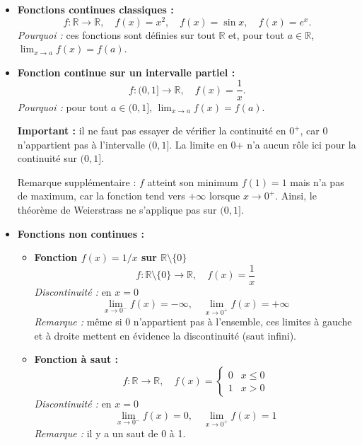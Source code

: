 \documentclass{report} %
\theoremstyle{definition}  %
\theoremstyle{plain} %
\theoremstyle{remark} %
\begin{document}
\begin{itemize}
    \item \textbf{Fonctions continues classiques :}  
    \[
    f : \mathbb{R} \to \mathbb{R}, \quad f(x) = x^2, \quad f(x) = \sin x, \quad f(x) = e^x.
    \]  
    \emph{Pourquoi :} ces fonctions sont définies sur tout \(\mathbb{R}\) et, pour tout
    \(a \in \mathbb{R}\), \(\lim_{x \to a} f(x) = f(a)\).

    \item \textbf{Fonction continue sur un intervalle partiel :}  
    \[
    f : (0,1] \to \mathbb{R}, \quad f(x) = \frac{1}{x}.
    \]  
    \emph{Pourquoi :} pour tout \(a \in (0,1]\), \(\lim_{x \to a} f(x) = f(a)\).  

    \medskip
    \noindent
    \textbf{Important :} il ne faut pas essayer de vérifier la continuité en \(0^+\),
    car 0 n’appartient pas à l’intervalle \((0,1]\). La limite en 0+ n’a
    aucun rôle ici pour la continuité sur \((0,1]\).  

    \medskip
    \noindent
    Remarque supplémentaire : \(f\) atteint son minimum \(f(1) = 1\) mais
    n’a pas de maximum, car la fonction tend vers \(+\infty\) lorsque \(x \to 0^+\). 
    Ainsi, le théorème de Weierstrass ne s’applique pas sur \((0,1]\).

    \item \textbf{Fonctions non continues :}
    \begin{itemize}
        \item \textbf{Fonction \(f(x) = 1/x\) sur \(\mathbb{R} \setminus \{0\}\)}  
        \[
        f : \mathbb{R} \setminus \{0\} \to \mathbb{R}, \quad f(x) = \frac{1}{x}
        \]  
        \emph{Discontinuité :} en \(x=0\)  
        \[
        \lim_{x \to 0^-} f(x) = -\infty, \quad \lim_{x \to 0^+} f(x) = +\infty
        \]  
        \emph{Remarque :} même si 0 n’appartient pas à l’ensemble, ces limites à gauche et à droite mettent en évidence la discontinuité (saut infini).

        \item \textbf{Fonction à saut :}  
        \[
        f : \mathbb{R} \to \mathbb{R}, \quad f(x) = 
        \begin{cases} 
            0 & x \le 0 \\ 
            1 & x > 0 
        \end{cases}
        \]  
        \emph{Discontinuité :} en \(x=0\)  
        \[
        \lim_{x \to 0^-} f(x) = 0, \quad \lim_{x \to 0^+} f(x) = 1
        \]  
        \emph{Remarque :} il y a un saut de 0 à 1.


\end{itemize}
\end{itemize}
\end{document}
